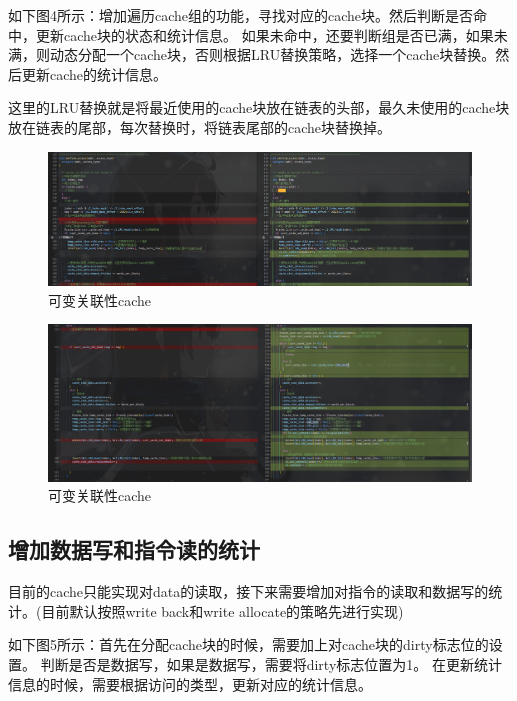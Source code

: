 \documentclass[12pt,hyperref,a4paper,UTF8]{ctexart}
\begin{document}
如下图4所示：增加遍历cache组的功能，寻找对应的cache块。然后判断是否命中，更新cache块的状态和统计信息。
如果未命中，还要判断组是否已满，如果未满，则动态分配一个cache块，否则根据LRU替换策略，选择一个cache块替换。然后更新cache的统计信息。

这里的LRU替换就是将最近使用的cache块放在链表的头部，最久未使用的cache块放在链表的尾部，每次替换时，将链表尾部的cache块替换掉。
\begin{figure}[H]
    \centering
    \includegraphics[width=1\textwidth]{./figures/fig/image3.png}
    \caption{可变关联性cache}
\end{figure}


\begin{figure}[H]
    \centering
    \includegraphics[width=1\textwidth]{./figures/fig/image4.png}
    \caption{可变关联性cache}
\end{figure}


\subsection{增加数据写和指令读的统计}

目前的cache只能实现对data的读取，接下来需要增加对指令的读取和数据写的统计。(目前默认按照write back和write allocate的策略先进行实现)

如下图5所示：首先在分配cache块的时候，需要加上对cache块的dirty标志位的设置。
判断是否是数据写，如果是数据写，需要将dirty标志位置为1。
在更新统计信息的时候，需要根据访问的类型，更新对应的统计信息。
\end{document}
